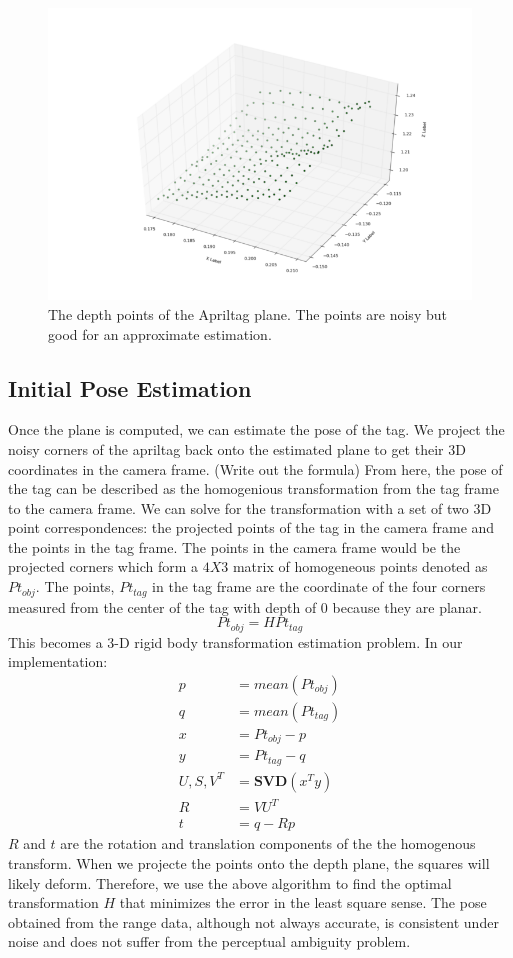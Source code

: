 \begin{figure}
\centering
\includegraphics[width=\columnwidth]{figs/depth_plane_fig}
\caption{The depth points of the Apriltag plane. The points are noisy but good for an approximate estimation.}
\label{fig:calib}
\end{figure}

\subsection{Initial Pose Estimation}
Once the plane is computed, we can estimate the pose of the tag. We project the noisy corners of the apriltag back onto the estimated plane to get their 3D coordinates in the camera frame. (Write out the formula) From here, the pose of the tag can be described as the homogenious transformation from the tag frame to the camera frame. We can solve for the transformation with a set of two 3D point correspondences: the projected points of the tag in the camera frame and the points in the tag frame. The points in the camera frame would be the projected corners which form a $4X3$ matrix of homogeneous points denoted as $Pt_{obj}$. The points, $Pt_{tag}$ in the tag frame are the coordinate of the four corners measured from the center of the tag with depth of 0 because they are planar. 
$$Pt_{obj} = H Pt_{tag}$$
This becomes a 3-D rigid body transformation estimation problem. In our implementation:
\begin{align*}
p &= mean(Pt_{obj})\\
q &= mean(Pt_{tag})\\
x &=Pt_{obj} - p\\
y &=Pt_{tag} - q\\
U, S, V^T &= \textbf{SVD}(x^T y)\\
R &= VU^T \\
t &= q-Rp 
\end{align*}
$R$ and $t$ are the rotation and translation components of the the homogenous transform. When we projecte the points onto the depth plane, the squares will likely deform. Therefore, we use the above algorithm to find the optimal transformation $H$ that minimizes the error in the least square sense. 
The pose obtained from the range data, although not always accurate, is consistent under noise and does not suffer from the perceptual ambiguity problem. 
